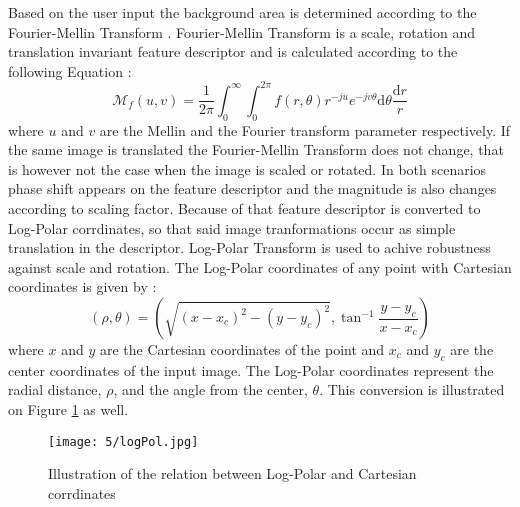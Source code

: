 \documentclass[draft,final]{vutinfth} %
\begin{document}
\par
Based on the user input the background area is determined according to the Fourier-Mellin Transform \cite{sheng1986circular}.
Fourier-Mellin Transform is a scale, rotation and translation invariant feature descriptor and is calculated according to the following Equation \cite{kazik2011visual}:
\[\mathcal{M}_f(u,v) = \frac{1}{2\pi} \int_{0}^{\infty}\int_{0}^{2\pi} f(r, \theta)r^{-ju}e^{-jv\theta}\mathrm{d}\theta\frac{\mathrm{d}r}{r}\]
where $u$ and $v$ are the Mellin and the Fourier transform parameter respectively.
If the same image is translated the Fourier-Mellin Transform does not change, that is however not the case when the image is scaled or rotated.
In both scenarios phase shift appears on the feature descriptor and the magnitude is also changes according to scaling factor.
Because of that feature descriptor is converted to Log-Polar corrdinates, so that said  image tranformations occur as simple translation in the descriptor.
Log-Polar Transform is used to achive robustness against scale and rotation.
The Log-Polar coordinates of any point with Cartesian coordinates is given by \cite{sarvaiya2012image}:
\[(\rho,\theta) = (\sqrt{(x-x_c)^2 - (y-y_c)^2}, \tan^{-1}\frac{y-y_c}{x-x_c})\]
where $x$ and $y$ are the Cartesian coordinates of the point and $x_c$ and $y_c$ are the center coordinates of the input image.
The Log-Polar coordinates represent the radial distance, $\rho$, and the angle from the center, $\theta$.
This conversion is illustrated on Figure \ref{fig:sans:logPol} as well.

\begin{figure}[h]
  \centering
  \texttt{[image: 5/logPol.jpg]}
  \caption{Illustration of the relation between Log-Polar and Cartesian corrdinates \cite{sarvaiya2012image}}
  \label{fig:sans:logPol} %
\end{figure}
\end{document}
